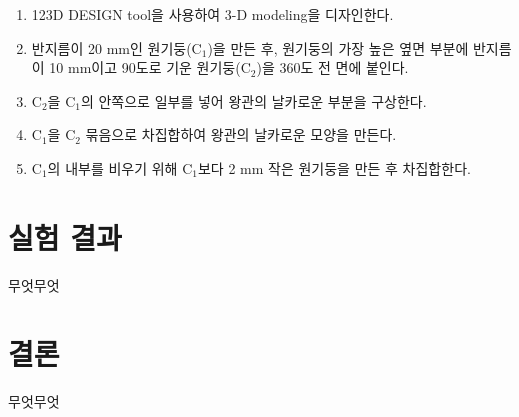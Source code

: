 \documentclass[a4paper, 10pt, nanum]{CSUniSchoolLabReport}
\begin{document}
\begin{enumerate}[label=\arabic*.]
	\item 123D DESIGN tool을 사용하여 3-D modeling을 디자인한다.
	\item 반지름이 20 mm인 원기둥(C$_1$)을 만든 후, 원기둥의 가장 높은 옆면 부분에 반지름이 10 mm이고 90도로 기운 원기둥(C$_2$)을 360도 전 면에 붙인다.
	\item C$_2$을 C$_1$의 안쪽으로 일부를 넣어 왕관의 날카로운 부분을 구상한다.
	\item C$_1$을 C$_2$ 묶음으로 차집합하여 왕관의 날카로운 모양을 만든다.
	\item C$_1$의 내부를 비우기 위해 C$_1$보다 2 mm 작은 원기둥을 만든 후 차집합한다.
\end{enumerate}


\section{실험 결과}

	무엇무엇



\section{결론}

	무엇무엇



\end{document}
